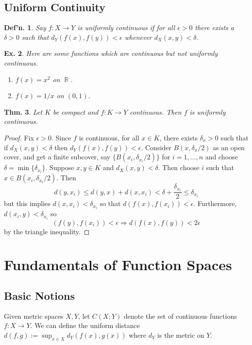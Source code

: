 \documentclass[12pt, a4paper]{book}
\DeclareMathOperator{\R}{\mathbb{R}}
\newtheorem{theorem}{Thm.}[section]
\newtheorem{definition}[theorem]{Def'n.}
\newtheorem{example}[theorem]{Ex.}
\theoremstyle{nonumberplain}
\newtheorem{proof}{Proof}
\begin{document}
\subsection{Uniform Continuity}
\begin{definition}
    Say $f:X\to Y$ is uniformly continuous if for all $\epsilon>0$ there exists a $\delta>0$ such that $d_Y(f(x),f(y))<\epsilon$
    whenever $d_X(x,y)<\delta$.
\end{definition}
\begin{example}
    Here are some functions which are continuous but not uniformly continuous.
    \begin{enumerate}
        \item $f(x)=x^2$ on $\R$.
        \item $f(x)=1/x$ on $(0,1)$.
    \end{enumerate}
\end{example}
\begin{theorem}
    Let $K$ be compact and $f:K\to Y$ continuous. Then $f$ is uniformly continuous.
\end{theorem}
\begin{proof}
    Fix $\epsilon>0$. Since $f$ is continuous, for all $x\in K$, there exists $\delta_x>0$ such that if $d_X(x,y)<\delta$
    then $d_Y(f(x),f(y))<\epsilon$. Consider $B(x,\delta_x/2)$ as an open cover, and get a finite subcover, say $\{B(x_i,\delta_{ x_i}/2)\}$
    for $i=1,\ldots,n$ and choose $\delta=\min\{\delta_{x_i}\}$. Suppose $x,y\in K$ and $d_X(x,y)<\delta$. Then choose $i$
    such that $x\in B(x_i,\delta_{x_i}/2)$. Then
    \[d(y,x_i)\leq d(y,x)+d(x,x_i)<\delta+\frac{\delta_{x_i}}{2}\leq\delta_{x_i}\]
    but this implies $d(x,x_i)<\delta_{x_i}$ so that $d(f(x),f(x_i))<\epsilon$. Furthermore, $d(x_i,y)<\delta_{x_i}$ so
    \[(f(y),f(x_i))<\epsilon\Rightarrow d(f(x),f(y))<2\epsilon\]
    by the triangle inequality.
\end{proof}



\section{Fundamentals of Function Spaces}
\subsection{Basic Notions}
Given metric spaces $X,Y$, let $C(X;Y)$ denote the set of continuous functions $f:X\to Y$.
We can define the uniform distance $d(f,g):=\sup_{x\in X}d_Y(f(x),g(x))$ where $d_Y$ is the metric on $Y$.
\end{document}
